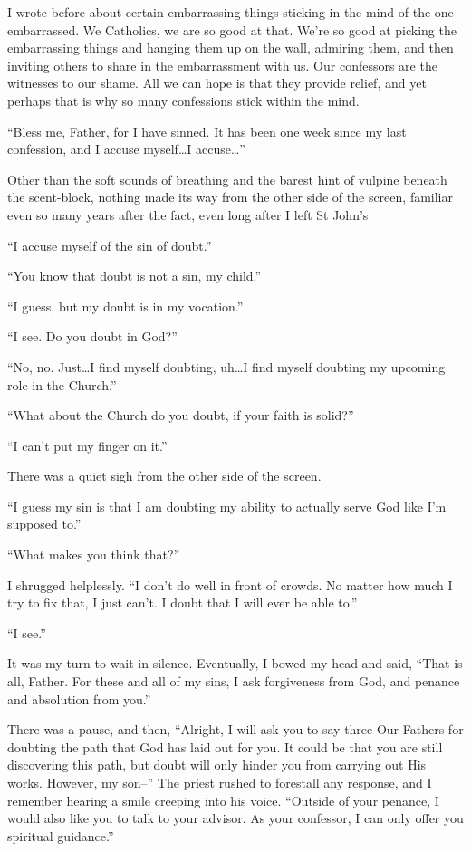 I wrote before about certain embarrassing things sticking in the mind of the one embarrassed. We Catholics, we are so good at that. We're so good at picking the embarrassing things and hanging them up on the wall, admiring them, and then inviting others to share in the embarrassment with us. Our confessors are the witnesses to our shame. All we can hope is that they provide relief, and yet perhaps that is why so many confessions stick within the mind.

``Bless me, Father, for I have sinned. It has been one week since my last confession, and I accuse myself\ldots I accuse\ldots{}''

Other than the soft sounds of breathing and the barest hint of vulpine beneath the scent-block, nothing made its way from the other side of the screen, familiar even so many years after the fact, even long after I left St John's

``I accuse myself of the sin of doubt.''

``You know that doubt is not a sin, my child.''

``I guess, but my doubt is in my vocation.''

``I see. Do you doubt in God?''

``No, no. Just\ldots I find myself doubting, uh\ldots I find myself doubting my upcoming role in the Church.''

``What about the Church do you doubt, if your faith is solid?''

``I can't put my finger on it.''

There was a quiet sigh from the other side of the screen.

``I guess my sin is that I am doubting my ability to actually serve God like I'm supposed to.''

``What makes you think that?''

I shrugged helplessly. ``I don't do well in front of crowds. No matter how much I try to fix that, I just can't. I doubt that I will ever be able to.''

``I see.''

It was my turn to wait in silence. Eventually, I bowed my head and said, ``That is all, Father. For these and all of my sins, I ask forgiveness from God, and penance and absolution from you.''

There was a pause, and then, ``Alright, I will ask you to say three Our Fathers for doubting the path that God has laid out for you. It could be that you are still discovering this path, but doubt will only hinder you from carrying out His works. However, my son--'' The priest rushed to forestall any response, and I remember hearing a smile creeping into his voice. ``Outside of your penance, I would also like you to talk to your advisor. As your confessor, I can only offer you spiritual guidance.''

